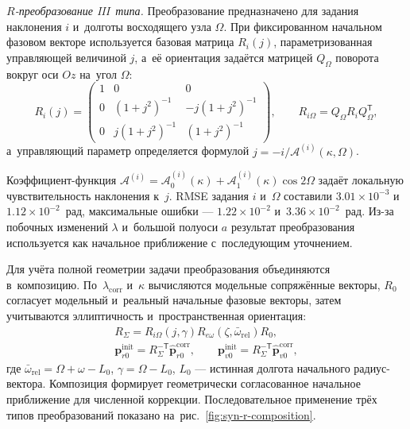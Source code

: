 \noindent\textit{$R$-преобразование III~типа.} Преобразование предназначено для задания наклонения $i$ и~долготы восходящего узла $\Omega$. При фиксированном начальном фазовом векторе используется базовая матрица $R_i(j)$, параметризованная управляющей величиной $j$, а~её ориентация задаётся матрицей $Q_\Omega$ поворота вокруг оси $Oz$ на~угол $\Omega$:
\begin{equation}
    R_i(j)=
    \begin{pmatrix}
        1&0&0\\
        0&(1+j^2)^{-1}&-j(1+j^2)^{-1}\\
        0&j(1+j^2)^{-1}&(1+j^2)^{-1}
    \end{pmatrix},
    \qquad
    R_{i\Omega}=Q_\Omega R_iQ_\Omega^{\mathsf T},
\end{equation}
а~управляющий параметр определяется формулой $j=-i/\mathcal A^{(i)}(\kappa,\Omega)$.\par\noindent
Коэффициент-функция $\mathcal A^{(i)}=\mathcal A_0^{(i)}(\kappa)+\mathcal A_1^{(i)}(\kappa)\cos2\Omega$ задаёт локальную чувствительность наклонения к~$j$. RMSE задания $i$ и~$\Omega$ составили $3.01\times10^{-3}$ и~$1.12\times10^{-2}$~рад, максимальные ошибки --- $1.22\times10^{-2}$ и~$3.36\times10^{-2}$~рад. Из-за побочных изменений $\lambda$ и~большой полуоси $a$ результат преобразования используется как начальное приближение с~последующим уточнением.

Для учёта полной геометрии задачи преобразования объединяются в~композицию. По~$\lambda_{\mathrm{corr}}$ и~$\kappa$ вычисляются модельные сопряжённые векторы, $R_0$ согласует модельный и~реальный начальные фазовые векторы, затем учитываются эллиптичность и~пространственная ориентация:
\begin{equation}
\begin{gathered}
    R_\Sigma=R_{i\Omega}(j,\gamma)
              R_{e\omega}(\zeta,\bar\omega_{\mathrm{rel}})R_0,\\
    \mathbf p_{r0}^{\mathrm{init}}=R_\Sigma^{-\mathsf T}
       \widehat{\mathbf p}_{r0}^{\mathrm{corr}},
    \qquad
    \mathbf p_{v0}^{\mathrm{init}}=R_\Sigma^{-\mathsf T}
       \widehat{\mathbf p}_{v0}^{\mathrm{corr}},
\end{gathered}
\label{eq:syn-r-composition}
\end{equation}
где $\bar\omega_{\mathrm{rel}}=\Omega+\omega-L_0$, $\gamma=\Omega-L_0$, $L_0$ --- истинная долгота начального радиус-вектора. Композиция формирует геометрически согласованное начальное приближение для численной коррекции. Последовательное применение трёх типов преобразований показано на~рис.~\ref{fig:syn-r-composition}.

